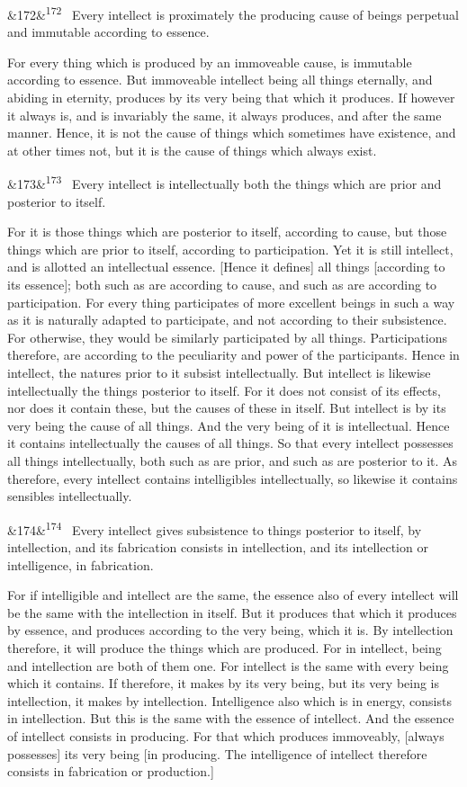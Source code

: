 \documentclass[12pt]{article}
\newcommand{\para}[1][]{\par\noindent\ifx&#1&\else\textsuperscript{\footnotesize #1}~\fi}
\begin{document}
\para[172] Every intellect is proximately the producing cause of beings perpetual and immutable according to essence.

For every thing which is produced by an immoveable cause, is immutable according to essence. But immoveable intellect being all things eternally, and abiding in eternity, produces by its very being that which it produces. If however it always is, and is invariably the same, it always produces, and after the same manner. Hence, it is not the cause of things which sometimes have existence, and at other times not, but it is the cause of things which always exist.

\para[173] Every intellect is intellectually both the things which are prior and posterior to itself.

For it is those things which are posterior to itself, according to cause, but those things which are prior to itself, according to participation. Yet it is still intellect, and is allotted an intellectual essence. [Hence it defines] all things [according to its essence]; both such as are according to cause, and such as are according to participation. For every thing participates of more excellent beings in such a way as it is naturally adapted to participate, and not according to their subsistence. For otherwise, they would be similarly participated by all things. Participations therefore, are according to the peculiarity and power of the participants. Hence in intellect, the natures prior to it subsist intellectually. But intellect is likewise intellectually the things posterior to itself. For it does not consist of its effects, nor does it contain these, but the causes of these in itself. But intellect is by its very being the cause of all things. And the very being of it is intellectual. Hence it contains intellectually the causes of all things. So that every intellect possesses all things intellectually, both such as are prior, and such as are posterior to it. As therefore, every intellect contains intelligibles intellectually, so likewise it contains sensibles intellectually.

\para[174] Every intellect gives subsistence to things posterior to itself, by intellection, and its fabrication consists in intellection, and its intellection or intelligence, in fabrication.

For if intelligible and intellect are the same, the essence also of every intellect will be the same with the intellection in itself. But it produces that which it produces by essence, and produces according to the very being, which it is. By intellection therefore, it will produce the things which are produced. For in intellect, being and intellection are both of them one. For intellect is the same with every being which it contains. If therefore, it makes by its very being, but its very being is intellection, it makes by intellection. Intelligence also which is in energy, consists in intellection. But this is the same with the essence of intellect. And the essence of intellect consists in producing. For that which produces immoveably, [always possesses] its very being [in producing. The intelligence of intellect therefore consists in fabrication or production.]
\end{document}
